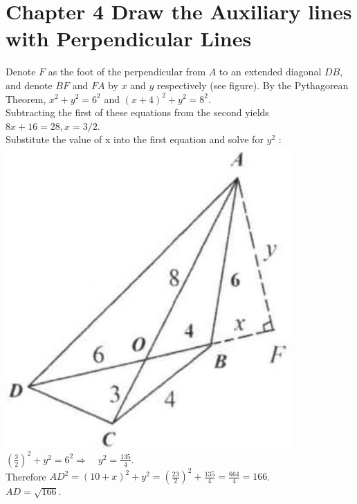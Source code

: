 \documentclass[10pt]{article}
\begin{document}
\section*{Chapter 4 Draw the Auxiliary lines with Perpendicular Lines}
Denote \(F\) as the foot of the perpendicular from \(A\) to an extended diagonal \(D B\), and denote \(B F\) and \(F A\) by \(x\) and \(y\) respectively (see figure). By the Pythagorean Theorem, \(x^{2}+y^{2}=6^{2}\) and \((x+4)^{2}+y^{2}=8^{2}\).\\
Subtracting the first of these equations from the second yields\\
\(8 x+16=28, x=3 / 2\).\\
Substitute the value of x into the first equation and solve for \(y^{2}\) :\\
\includegraphics[max width=\textwidth, center]{2025_04_17_97bc1f7e44d93c271a88g-082(2)}\\
\(\left(\frac{3}{2}\right)^{2}+y^{2}=6^{2} \Rightarrow \quad y^{2}=\frac{135}{4}\).\\
Therefore \(A D^{2}=(10+x)^{2}+y^{2}=\left(\frac{23}{2}\right)^{2}+\frac{135}{4}=\frac{664}{4}=166\).\\
\(A D=\sqrt{166}\).
\end{document}
